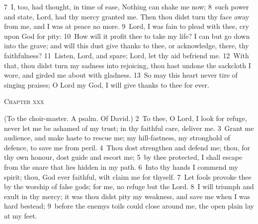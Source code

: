 \documentclass[10pt]{book} %
\begin{document}
\textcolor{benred8}{7}~I, too, had thought, in time of ease, Nothing can shake me now; \textcolor{benred8}{8}~such power and state, Lord, had thy mercy granted me. Then thou didst turn thy face away from me, and I was at peace no more. \textcolor{benred8}{9}~Lord, I was fain to plead with thee, cry upon God for pity: \textcolor{benred8}{10}~How will it profit thee to take my life? I can but go down into the grave; and will this dust give thanks to thee, or acknowledge, there, thy faithfulness? \textcolor{benred8}{11}~Listen, Lord, and spare; Lord, let thy aid befriend me. \textcolor{benred8}{12}~With that, thou didst turn my sadness into rejoicing, thou hast undone the sackcloth I wore, and girded me about with gladness. \textcolor{benred8}{13}~So may this heart never tire of singing praises; O Lord my God, I will give thanks to thee for ever.
\begin{large}\begin{center}\textsc{Chapter xxx}\end{center}\end{large}
(To the choir-master. A psalm. Of David.)
\textcolor{benred8}{2}~To thee, O Lord, I look for refuge, never let me be ashamed of my trust; in thy faithful care, deliver me. \textcolor{benred8}{3}~Grant me audience, and make haste to rescue me; my hill-fastness, my stronghold of defence, to save me from peril. \textcolor{benred8}{4}~Thou dost strengthen and defend me; thou, for thy own honour, dost guide and escort me; \textcolor{benred8}{5}~by thee protected, I shall escape from the snare that lies hidden in my path. \textcolor{benred8}{6}~Into thy hands I commend my spirit; thou, God ever faithful, wilt claim me for thyself. \textcolor{benred8}{7}~Let fools provoke thee by the worship of false gods; for me, no refuge but the Lord. \textcolor{benred8}{8}~I will triumph and exult in thy mercy; it was thou didst pity my weakness, and save me when I was hard bestead; \textcolor{benred8}{9}~before the enemy\textquotesingle s toils could close around me, the open plain lay at my feet.
\end{document}
